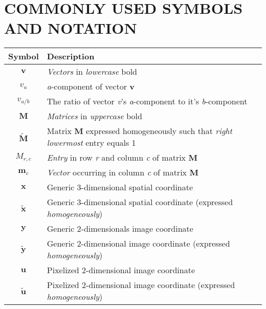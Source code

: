 \chapter*{COMMONLY USED SYMBOLS AND NOTATION}

\begin{longtable}{c p{10.5cm}}
\multicolumn{1}{l}{\textbf{Symbol}} & \textbf{Description} \\
\midrule
$\mathbf{v}$ & \textit{Vectors} in \textit{lowercase} bold\\
$v_a$ & \textit{a}-component of vector $\mathbf{v}$ \\
$v_{a/b}$ & The ratio of vector \textit{v}'s \textit{a}-component to it's \textit{b}-component\\
$\mathbf{M}$ & \textit{Matrices} in \textit{uppercase} bold\\ 
$\mathbf{\tilde{M}}$ & Matrix $\mathbf{M}$ expressed {homogeneously} such that \textit{right lowermost} entry equals 1\\
$M_{r,c}$ & \textit{Entry} in row \textit{r} and column \textit{c} of matrix $\mathbf{M}$\\
$\mathbf{m}_c$ & \textit{Vector} occurring in column \textit{c} of matrix $\mathbf{M}$\\
$\mathbf{x}$ & Generic 3-dimensional spatial coordinate\\
$\mathbf{\tilde{x}}$ & Generic 3-dimensional spatial coordinate (expressed \textit{homogeneously})\\

$\mathbf{y}$ & Generic 2-dimensionals image coordinate\\
$\mathbf{\tilde{y}}$ & Generic 2-dimensional image coordinate (expressed \textit{homogeneously})\\


$\mathbf{u}$ & Pixelized 2-dimensional image coordinate\\
$\mathbf{\tilde{u}}$ & Pixelized 2-dimensional image coordinate (expressed \textit{homogeneously})\\



\end{longtable}
